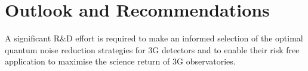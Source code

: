 
\section{Outlook and Recommendations}
A significant R\&D effort is required to make an informed selection of the optimal quantum noise reduction strategies for 3G detectors and to enable their risk free application to maximise the science return of 3G 
 observatories. 


